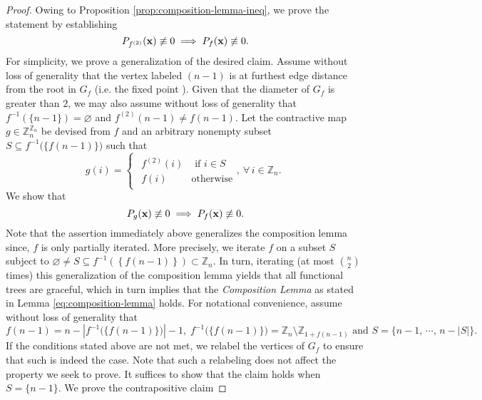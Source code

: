 \begin{proof}
Owing to Proposition \ref{prop:composition-lemma-ineq}, we prove the statement by establishing 
\[
    P_{f^{(2)}} ({\bf x}) \not\equiv 0  \implies  P_{f} ({\bf x}) \not\equiv 0.
\]
For simplicity, we prove a generalization of the desired claim. Assume without loss of generality that the vertex labeled $(n-1)$ is at furthest edge distance from the root in $G_f$ (i.e. the fixed point ). Given that the diameter of $G_{f}$ is greater than $2$, we may also assume without loss of generality that  $f^{-1}\left(\{n-1\}\right)=\varnothing$
and $f^{(2)}(n-1)\ne f(n-1)$. Let the contractive
map $g\in\mathbb{Z}_{n}^{\mathbb{Z}_{n}}$ be devised from $f$ and an arbitrary nonempty subset $S\subseteq f^{-1}\big(\{f(n-1)\}\big)$ such
that 
\begin{equation}
g(i)=\begin{cases}
\begin{array}{cc}
f^{(2)}(i) & \text{ if }i\in S\\
f(i) & \text{otherwise}
\end{array},\ \forall\,i\in\mathbb{Z}_{n}.\end{cases}
\end{equation}
We show that
\begin{equation} \label{eq:composition-lemma-generalized}
P_{g} ({\bf x}) \not\equiv 0  \implies  P_{f} ({\bf x}) \not\equiv 0.
\end{equation}
Note that the assertion immediately above generalizes the composition
lemma since, $f$ is only partially
iterated. More precisely, we iterate $f$ on a subset $S$ subject to
$\varnothing\ne S\subseteq f^{-1}\left(\left\{ f(n-1)\right\} \right)\subset\mathbb{Z}_{n}$.
In turn, iterating (at most ${n \choose 2}$ times) this generalization  of the composition lemma yields
that all functional trees are graceful, which in turn implies that the \textit{Composition Lemma} as stated in Lemma \ref{eq:composition-lemma}  holds. For notational convenience, assume without loss of generality that 
\begin{equation}
f(n-1)=n-\left|f^{-1}\big(\{f(n-1)\}\big)\right|-1,\; f^{-1}\big(\{f(n-1)\}\big)=\mathbb{Z}_{n}\setminus\mathbb{Z}_{1+f(n-1)} \text{ and } S=\big\{ n-1,\,\cdots,\,n-|S|\big\}.
\end{equation}
If the conditions stated above are not met, we relabel the vertices of $G_f$ to ensure that such is indeed the case. Note that such a relabeling does not affect the property we seek to prove. It suffices to show that the claim holds when $S=\{n-1\}$. We prove the contrapositive claim

\end{proof}
